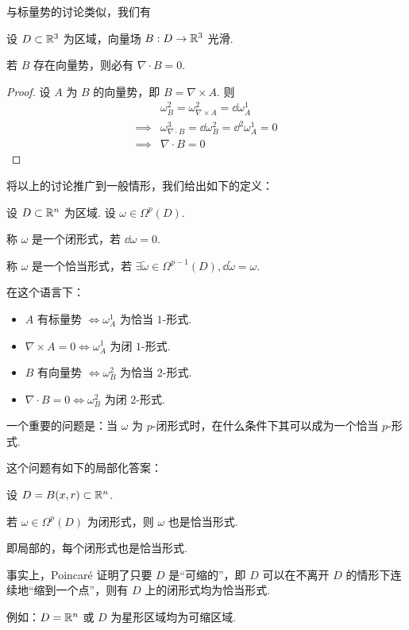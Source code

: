 与标量势的讨论类似，我们有

\begin{property}
    设 $D\subset\mathbb{R}^3$ 为区域，向量场 $B:D\to\mathbb{R}^3$ 光滑.

    若 $B$ 存在向量势，则必有 $\nabla\cdot B=0$.
\end{property}
\begin{proof}
    设 $A$ 为 $B$ 的向量势，即 $B=\nabla\times A$. 则
$$
\begin{aligned}
    &\omega_B^2=\omega_{\nabla\times A}^2=\dd\omega_A^1\\
    \implies&\omega_{\nabla\cdot B}^3=\dd\omega_B^2=\dd^2\omega_A^1=0\\
    \implies&\nabla\cdot B=0
\end{aligned}
$$
\end{proof}

将以上的讨论推广到一般情形，我们给出如下的定义：

\begin{definition}
    设 $D\subset\mathbb{R}^n$ 为区域. 设 $\omega\in\Omega^p(D)$.

    称 $\omega$ 是一个闭形式，若 $\dd\omega=0$.

    称 $\omega$ 是一个恰当形式，若 $\exists\widetilde{\omega}\in\Omega^{p-1}(D),\dd\widetilde{\omega}=\omega$.
\end{definition}

在这个语言下：

\begin{itemize}
    \item $A$ 有标量势 $\iff\omega_A^1$ 为恰当 $1$-形式.
    
    \item $\nabla\times A=0\iff\omega_A^1$ 为闭 $1$-形式.
    
    \item $B$ 有向量势 $\iff\omega_B^2$ 为恰当 $2$-形式.
    
    \item $\nabla\cdot B=0\iff\omega_B^2$ 为闭 $2$-形式.
\end{itemize}

一个重要的问题是：当 $\omega$ 为 $p$-闭形式时，在什么条件下其可以成为一个恰当 $p$-形式.

这个问题有如下的局部化答案：

\begin{theorem}[Poincaré]
    设 $D=B(x,r)\subset\mathbb{R}^n$.

    若 $\omega\in\Omega^p(D)$ 为闭形式，则 $\omega$ 也是恰当形式.
\end{theorem}

即局部的，每个闭形式也是恰当形式.

\begin{hint}
    事实上，Poincaré 证明了只要 $D$ 是“可缩的”，即 $D$ 可以在不离开 $D$ 的情形下连续地“缩到一个点”，则有 $D$ 上的闭形式均为恰当形式.

    例如：$D=\mathbb{R}^n$ 或 $D$ 为星形区域均为可缩区域.

\end{hint}